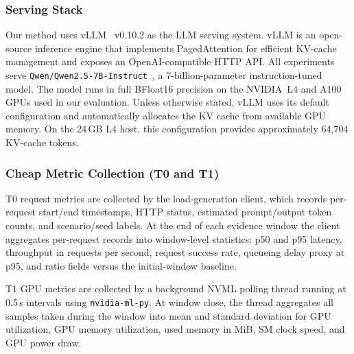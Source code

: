 \subsubsection{Serving Stack}
Our method uses vLLM~\cite{kwon2023vllm} v0.10.2 as the LLM serving system. vLLM is an open-source inference engine that implements PagedAttention for efficient KV-cache management and exposes an OpenAI-compatible HTTP API. All experiments serve \texttt{Qwen/Qwen2.5-7B-Instruct}~\cite{qwen2025}, a 7-billion-parameter instruction-tuned model. The model runs in full BFloat16 precision on the NVIDIA~L4 and A100 GPUs used in our evaluation. Unless otherwise stated, vLLM uses its default configuration and automatically allocates the KV cache from available GPU memory. On the 24\,GB L4 host, this configuration provides approximately 64,704 KV-cache tokens.



\subsubsection{Cheap Metric Collection (T0 and T1)}

T0 request metrics are collected by the load-generation client, which records per-request start/end timestamps, HTTP status, estimated prompt/output token counts, and scenario/seed labels. At the end of each evidence window the client aggregates per-request records into window-level statistics: p50 and p95 latency, throughput in requests per second, request success rate, queueing delay proxy at p95, and ratio fields versus the initial-window baseline.

T1 GPU metrics are collected by a background NVML polling thread running at 0.5\,s intervals using \texttt{nvidia-ml-py}. At window close, the thread aggregates all samples taken during the window into mean and standard deviation for GPU utilization, GPU memory utilization, used memory in MiB, SM clock speed, and GPU power draw.

